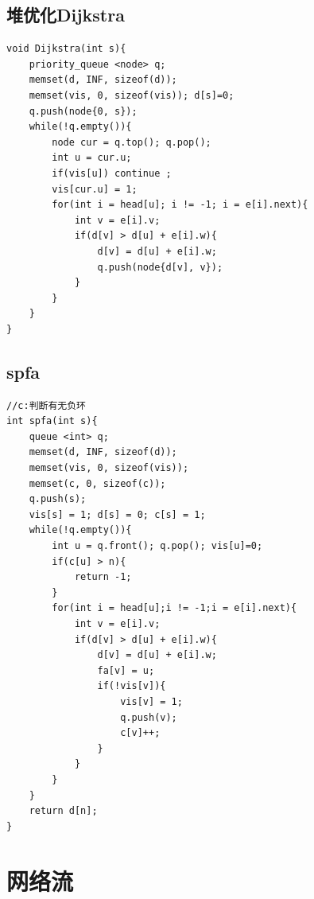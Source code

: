 \documentclass[a4paper,11pt,twoside,fontset = fandol,UTF8]{ctexbook} %
\begin{document}
	\subsection{堆优化Dijkstra}
	\begin{lstlisting}
void Dijkstra(int s){
    priority_queue <node> q;
	memset(d, INF, sizeof(d));
    memset(vis, 0, sizeof(vis)); d[s]=0;
    q.push(node{0, s});
    while(!q.empty()){
        node cur = q.top(); q.pop();
        int u = cur.u;
        if(vis[u]) continue ;
        vis[cur.u] = 1;
        for(int i = head[u]; i != -1; i = e[i].next){
            int v = e[i].v;
            if(d[v] > d[u] + e[i].w){
                d[v] = d[u] + e[i].w;
                q.push(node{d[v], v});
            }
        }
    }
}
	\end{lstlisting}
	\subsection{spfa}
	\begin{lstlisting}
//c:判断有无负环
int spfa(int s){
    queue <int> q;
    memset(d, INF, sizeof(d));
    memset(vis, 0, sizeof(vis));
    memset(c, 0, sizeof(c));
    q.push(s);
    vis[s] = 1; d[s] = 0; c[s] = 1;
    while(!q.empty()){
        int u = q.front(); q.pop(); vis[u]=0;
        if(c[u] > n){
            return -1;
        }
        for(int i = head[u];i != -1;i = e[i].next){
            int v = e[i].v;
            if(d[v] > d[u] + e[i].w){
                d[v] = d[u] + e[i].w;
                fa[v] = u;
                if(!vis[v]){
                    vis[v] = 1;
                    q.push(v);
                    c[v]++;
                }
            }
        }
    }
    return d[n];
}
	\end{lstlisting}
	\section{网络流}
\end{document}
